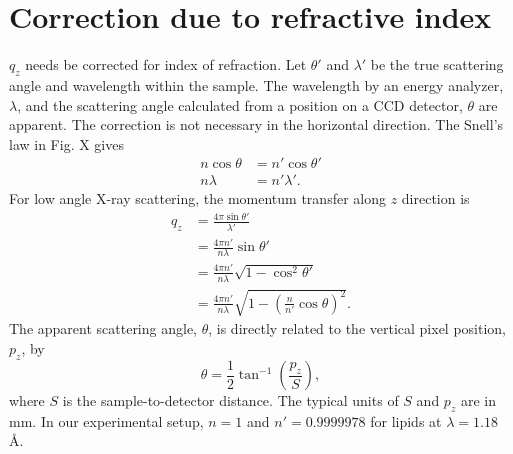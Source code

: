 \documentclass[12pt,letterpaper]{article}
\begin{document}
\section{Correction due to refractive index}
$q_z$ needs be corrected for index of refraction.
Let $\theta'$ and $\lambda'$ be the true scattering angle and wavelength
within the sample. The wavelength by an energy analyzer, $\lambda$, and the 
scattering angle calculated from a position on a CCD detector, $\theta$ are 
apparent. The correction is not necessary in the horizontal direction.
The Snell's law in Fig. X gives
\begin{align}
  n\cos\theta &= n'\cos\theta' \\
  n\lambda &= n'\lambda'.
\end{align}
For low angle X-ray scattering, the momentum transfer along $z$ direction is
\begin{align}
  q_z &= \frac{4\pi\sin\theta'}{\lambda'} \\
      &= \frac{4\pi n'}{n\lambda}\sin\theta' \\
      &= \frac{4\pi n'}{n\lambda}\sqrt{1-\cos^2\theta'} \\
      &= \frac{4\pi n'}{n\lambda}\sqrt{1-\left(\frac{n}{n'}\cos\theta\right)^2}.
\end{align}
The apparent scattering angle, $\theta$, is directly related to the vertical
pixel position, $p_z$, by 
\begin{equation}
  \theta = \frac{1}{2}\tan^{-1}\left(\frac{p_z}{S}\right),
\end{equation}
where $S$ is the sample-to-detector distance. The typical units of $S$ and 
$p_z$ are in mm. In our experimental setup,
$n=1$ and $n'=0.9999978$ for lipids at $\lambda=1.18$ \AA. 




\end{document}
